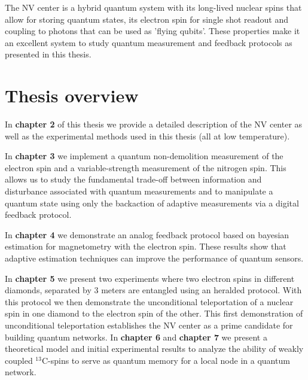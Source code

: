 The NV center is a hybrid quantum system with its long-lived nuclear spins that allow for storing quantum states, its electron spin for single shot readout and coupling to photons that can be used as 'flying qubits'. These properties make it an excellent system to study quantum measurement and feedback protocols as presented in this thesis.

\section{Thesis overview}

In \textbf{chapter 2} of this thesis we provide a detailed description of the NV center as well as the experimental methods used in this thesis (all at low temperature).

In \textbf{chapter 3} we implement a quantum non-demolition measurement of the electron spin and a variable-strength measurement of the nitrogen spin. This allows us to study the fundamental trade-off between information and disturbance associated with quantum measurements and to manipulate a quantum state using only the backaction of adaptive measurements via a digital feedback protocol.

In \textbf{chapter 4} we demonstrate an analog feedback protocol based on bayesian estimation for magnetometry with the electron spin. These results show that adaptive estimation techniques can improve the performance of quantum sensors.

In \textbf{chapter 5} we present two experiments where two electron spins in different diamonds, separated by 3 meters are entangled using an heralded protocol. With this protocol we then demonstrate the unconditional teleportation of a nuclear spin in one diamond to the electron spin of the other. This first demonstration of unconditional teleportation establishes the NV center as a prime candidate for building quantum networks.
\cite{Taylor_NatPhys_2008}
In \textbf{chapter 6} and \textbf{chapter 7} we present a theoretical model and initial experimental results to analyze the ability of weakly coupled $^{13}$C-spins to serve as quantum memory for a local node in a quantum network.

\clearpage





